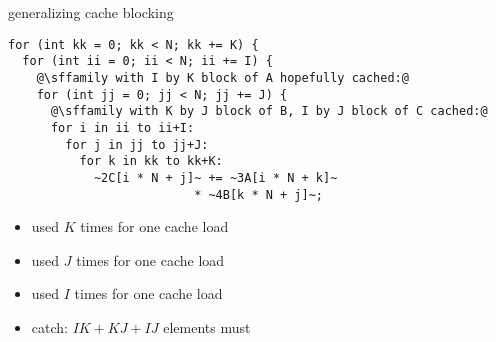 \begin{frame}[fragile,label=cacheBlockExample]{generalizing cache blocking}
\vspace{-.25cm}
\begin{lstlisting}
for (int kk = 0; kk < N; kk += K) {
  for (int ii = 0; ii < N; ii += I) {
    @\sffamily with I by K block of A hopefully cached:@
    for (int jj = 0; jj < N; jj += J) {
      @\sffamily with K by J block of B, I by J block of C cached:@
      for i in ii to ii+I:
        for j in jj to jj+J:
          for k in kk to kk+K:
            ~2C[i * N + j]~ += ~3A[i * N + k]~
                          * ~4B[k * N + j]~;
\end{lstlisting}
\begin{itemize}
    \item {} used $K$ times for one cache load
    \item {} used $J$ times for one cache load
    \item {} used $I$ times for one cache load
\item catch: $IK+KJ+IJ$ elements must 
\end{itemize}
\end{frame}
